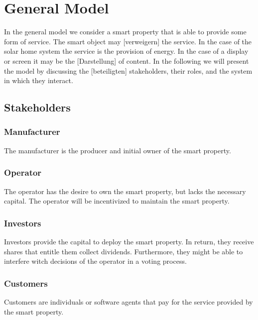 \section{General Model}

In the general model we consider a smart property that is able to provide some form of service. The smart object may [verweigern] the service. In the case of the solar home system the service is the provision of energy. In the case of a display or screen it may be the [Darstellung] of content. In the following we will present the model by discussing the [beteiligten] stakeholders, their roles, and the system in which they interact.

\subsection{Stakeholders}

\subsubsection{Manufacturer}

The manufacturer is the producer and initial owner of the smart property.

\subsubsection{Operator}

The operator has the desire to own the smart property, but lacks the necessary capital. The operator will be incentivized to maintain the smart property.

\subsubsection{Investors}

Investors provide the capital to deploy the smart property. In return, they receive shares that entitle them collect dividends. Furthermore, they might be able to interfere witch decisions of the operator in a voting process.

\subsubsection{Customers}

Customers are individuals or software agents that pay for the service provided by the smart property.



